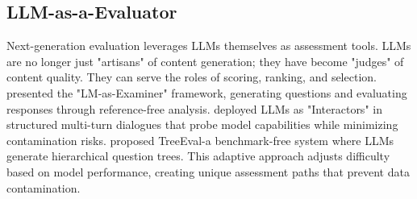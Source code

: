 \subsection{LLM-as-a-Evaluator}
\label{sec:llm driven evaluation}
Next-generation evaluation leverages LLMs themselves as assessment tools. 
LLMs are no longer just "artisans" of content generation; they have become "judges" of content quality. They can serve the roles of scoring, ranking, and selection. \citet{bai2024benchmarking} presented the "LM-as-Examiner" framework, generating questions and evaluating responses through reference-free analysis. \citet{yu-etal-2024-kieval} deployed LLMs as "Interactors" in structured multi-turn dialogues that probe model capabilities while minimizing contamination risks.
\citet{li2024treeevalbenchmarkfreeevaluationlarge} proposed TreeEval-a benchmark-free system where LLMs generate hierarchical question trees. This adaptive approach adjusts difficulty based on model performance, creating unique assessment paths that prevent data contamination.
